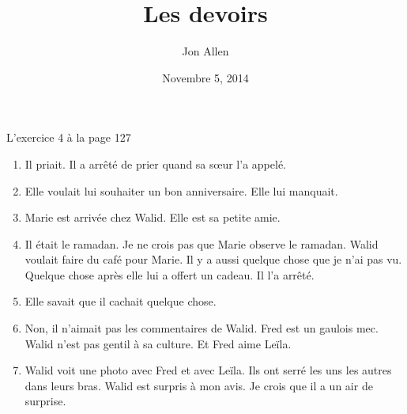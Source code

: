 \documentclass[letterpaper]{article}
\begin{document}
\title{Les devoirs}
\date{Novembre 5, 2014}
\author{Jon Allen}
\maketitle
L'exercice 4 à la page 127
\begin{enumerate}
\item
Il priait. Il a arrêté de prier quand sa sœur l'a appelé.
\item
Elle voulait lui souhaiter un bon anniversaire. Elle lui manquait.
\item
Marie est arrivée chez Walid. Elle est sa petite amie.
\item
Il était le ramadan. Je ne crois pas que Marie observe le ramadan. Walid voulait faire du café pour Marie. Il y a aussi quelque chose que je n'ai pas vu. Quelque chose après elle lui a offert un cadeau. Il l'a arrêté.
\item
Elle savait que il cachait quelque chose.
\item
Non, il n'aimait pas les commentaires de Walid. Fred est un gaulois mec. Walid n'est pas gentil à sa culture. Et Fred aime Leïla.
\item
Walid voit une photo avec Fred et avec Leïla. Ils ont serré les uns les autres dans leurs bras. Walid est surpris à mon avis. Je crois que il a un air de surprise.
\end{enumerate}
\end{document}
